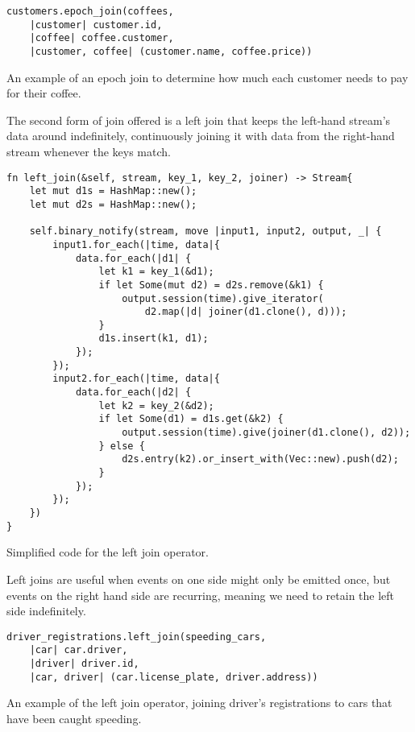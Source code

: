 \begin{listing}[H]
\begin{verbatim}
customers.epoch_join(coffees,
    |customer| customer.id, 
    |coffee| coffee.customer, 
    |customer, coffee| (customer.name, coffee.price))
\end{verbatim}
\caption{An example of an epoch join to determine how much each customer needs to pay for their coffee.}
\label{lst:epoch-join-example}
\end{listing}

The second form of join offered is a left join that keeps the left-hand stream's data around indefinitely, continuously joining it with data from the right-hand stream whenever the keys match.

\begin{listing}[H]
\begin{verbatim}
fn left_join(&self, stream, key_1, key_2, joiner) -> Stream{
    let mut d1s = HashMap::new();
    let mut d2s = HashMap::new();

    self.binary_notify(stream, move |input1, input2, output, _| {
        input1.for_each(|time, data|{
            data.for_each(|d1| {
                let k1 = key_1(&d1);
                if let Some(mut d2) = d2s.remove(&k1) {
                    output.session(time).give_iterator(
                        d2.map(|d| joiner(d1.clone(), d)));
                }
                d1s.insert(k1, d1);
            });
        });
        input2.for_each(|time, data|{
            data.for_each(|d2| {
                let k2 = key_2(&d2);
                if let Some(d1) = d1s.get(&k2) {
                    output.session(time).give(joiner(d1.clone(), d2));
                } else {
                    d2s.entry(k2).or_insert_with(Vec::new).push(d2);
                }
            });
        });
    })
}
\end{verbatim}
  \caption{Simplified code for the left join operator.}
  \label{lst:left-join}
\end{listing}

Left joins are useful when events on one side might only be emitted once, but events on the right hand side are recurring, meaning we need to retain the left side indefinitely.

\begin{listing}[H]
\begin{verbatim}
driver_registrations.left_join(speeding_cars,
    |car| car.driver,
    |driver| driver.id,
    |car, driver| (car.license_plate, driver.address))
\end{verbatim}
\caption{An example of the left join operator, joining driver's registrations to cars that have been caught speeding.}
\label{lst:left-join-example}
\end{listing}

